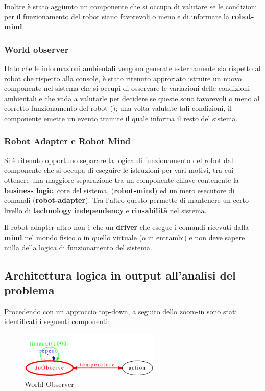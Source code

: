 Inoltre è stato aggiunto un componente che si occupa di valutare se le condizioni per il funzionamento del robot siano favorevoli o meno e di informare la \textbf{robot-mind}.

\subsubsection{World observer}

Dato che le informazioni ambientali vengono generate esternamente sia rispetto al robot che rispetto alla console,
è stato ritenuto approriato istruire un nuovo componente nel sistema che si occupi di osservare le variazioni delle condizioni ambientali
e che vada a valutarle per decidere se queste sono favorevoli o meno al corretto funzionamento del robot ();
una volta valutate tali condizioni, il componente emette un evento tramite il quale informa il resto del sistema.

\subsubsection{Robot Adapter e Robot Mind}

Si è ritenuto opportuno separare la logica di funzionamento del robot dal componente che si occupa di eseguire le istruzioni per vari motivi,
tra cui ottenere una maggiore separazione tra un componente chiave contenente la \textbf{business logic}, core del sistema, (\textbf{robot-mind}) ed un mero esecutore di comandi (\textbf{robot-adapter}).
Tra l'altro questo permette di mantenere un certo livello di \textbf{technology independency} e \textbf{riusabilità} nel sistema.

Il robot-adapter altro non è che un \textbf{driver} che esegue i comandi ricevuti dalla \textbf{mind} nel mondo fisico o in quello virtuale (o in entrambi) e non deve sapere nulla della logica di funzionamento del sistema.

\subsection{Architettura logica in output all'analisi del problema}

Procedendo con un approccio top-down, a seguito dello zoom-in sono stati identificati i seguenti componenti:

\begin{figure}[H]
  \centering
  \includegraphics[width=0.6\textwidth]{res/sprint1/problem/world_observer}
  \caption{World Observer}%
  \label{fig:sp1:prob:worldobserver}
\end{figure}

